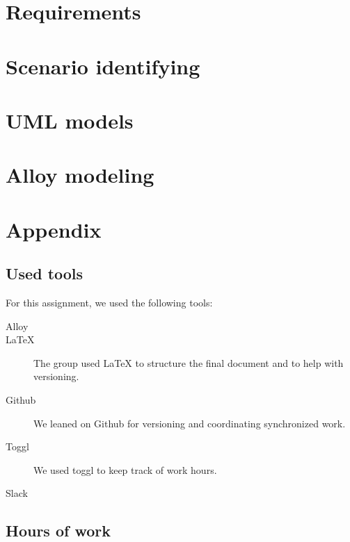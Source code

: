 \documentclass{article}
\begin{document}
	\newpage
	\section{Requirements}
	

	\newpage
	\section{Scenario identifying}
	
		

	\newpage
	\section{UML models}
	

	\newpage
	\section{Alloy modeling}

	\newpage
	\section{Appendix}
		\listoffigures
		\listoftables
		
		\subsection{Used tools}
		For this assignment, we used the following tools:
		
		\begin{description}
			\item [Alloy]
			\item [LaTeX] The group used LaTeX to structure the final document and to help with versioning.
			\item [Github] We leaned on Github for versioning and coordinating synchronized work.
			\item [Toggl] We used toggl to keep track of work hours.
			\item [Slack]  
			
		\end{description}
		
		\subsection{Hours of work}
\end{document}
